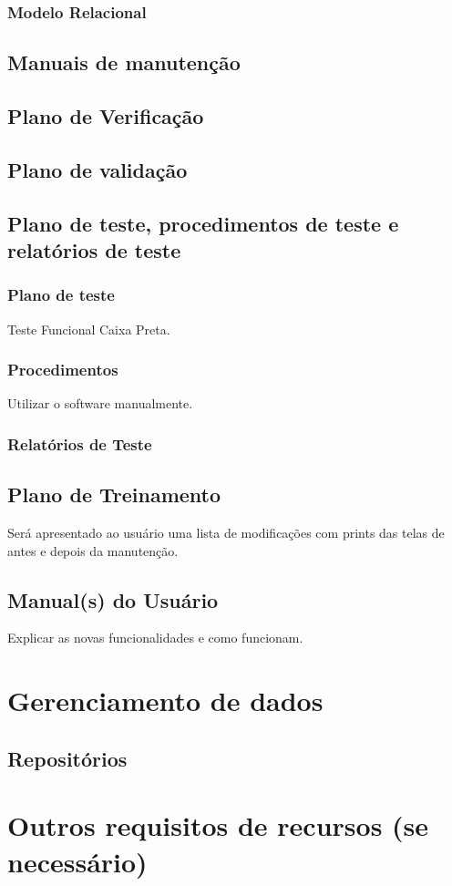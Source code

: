 \subsubsection{Modelo Relacional} 

\subsection{Manuais de manutenção}

\subsection{Plano de Verificação}

\subsection{Plano de validação}

\subsection{Plano de teste, procedimentos de teste e relatórios de teste}

\subsubsection{Plano de teste}

Teste Funcional Caixa Preta.

\subsubsection{Procedimentos}

Utilizar o software manualmente.

\subsubsection{Relatórios de Teste}


\subsection{Plano de Treinamento}

 Será apresentado ao usuário uma lista de modificações com prints das telas de antes e depois da manutenção. 

\subsection{Manual(s) do Usuário}

Explicar as novas funcionalidades e como funcionam.

\section{Gerenciamento de dados}

\subsection{Repositórios}

\section{Outros requisitos de recursos (se necessário)}
